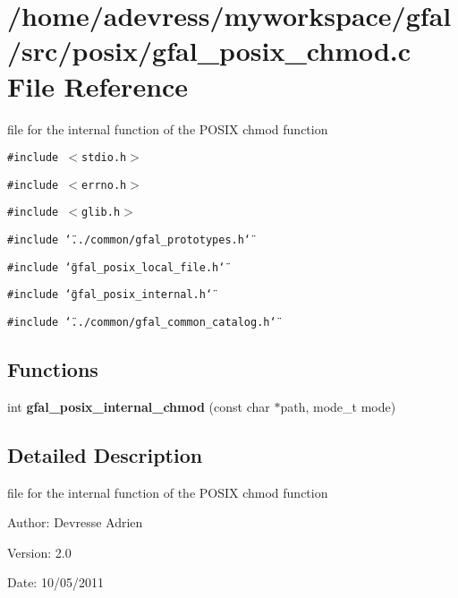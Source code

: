 \section{/home/adevress/myworkspace/gfal/src/posix/gfal\_\-posix\_\-chmod.c File Reference}
\label{gfal__posix__chmod_8c}
file for the internal function of the POSIX chmod function 

{\tt \#include $<$stdio.h$>$}\par
{\tt \#include $<$errno.h$>$}\par
{\tt \#include $<$glib.h$>$}\par
{\tt \#include \char`\"{}../common/gfal\_\-prototypes.h\char`\"{}}\par
{\tt \#include \char`\"{}gfal\_\-posix\_\-local\_\-file.h\char`\"{}}\par
{\tt \#include \char`\"{}gfal\_\-posix\_\-internal.h\char`\"{}}\par
{\tt \#include \char`\"{}../common/gfal\_\-common\_\-catalog.h\char`\"{}}\par
\subsection*{Functions}
\begin{CompactItemize}
\item 
int \textbf{gfal\_\-posix\_\-internal\_\-chmod} (const char $\ast$path, mode\_\-t mode)\label{gfal__posix__chmod_8c_e0273008201a878710ad033d08258810}

\end{CompactItemize}


\subsection{Detailed Description}
file for the internal function of the POSIX chmod function 

\begin{Desc}
\item[Author:]Devresse Adrien \end{Desc}
\begin{Desc}
\item[Version:]2.0 \end{Desc}
\begin{Desc}
\item[Date:]10/05/2011 \end{Desc}
